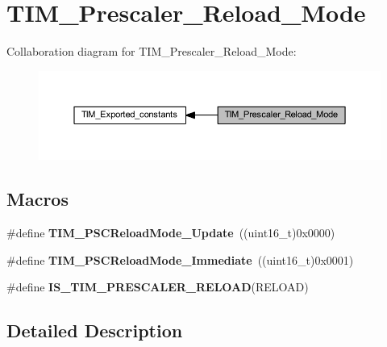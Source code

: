 \hypertarget{group___t_i_m___prescaler___reload___mode}{}\section{T\+I\+M\+\_\+\+Prescaler\+\_\+\+Reload\+\_\+\+Mode}
\label{group___t_i_m___prescaler___reload___mode}
Collaboration diagram for T\+I\+M\+\_\+\+Prescaler\+\_\+\+Reload\+\_\+\+Mode\+:\nopagebreak
\begin{figure}[H]
\begin{center}
\leavevmode
\includegraphics[width=350pt]{group___t_i_m___prescaler___reload___mode}
\end{center}
\end{figure}
\subsection*{Macros}
\begin{DoxyCompactItemize}
\item 
\mbox{\label{group___t_i_m___prescaler___reload___mode_gad76dd05a3ae4e44e040e0e083bd460bf}} 
\#define {\bfseries T\+I\+M\+\_\+\+P\+S\+C\+Reload\+Mode\+\_\+\+Update}~((uint16\+\_\+t)0x0000)
\item 
\mbox{\label{group___t_i_m___prescaler___reload___mode_ga9ba55481ccdcb64268b7b9f2095bfc17}} 
\#define {\bfseries T\+I\+M\+\_\+\+P\+S\+C\+Reload\+Mode\+\_\+\+Immediate}~((uint16\+\_\+t)0x0001)
\item 
\#define {\bfseries I\+S\+\_\+\+T\+I\+M\+\_\+\+P\+R\+E\+S\+C\+A\+L\+E\+R\+\_\+\+R\+E\+L\+O\+AD}(R\+E\+L\+O\+AD)
\end{DoxyCompactItemize}


\subsection{Detailed Description}


